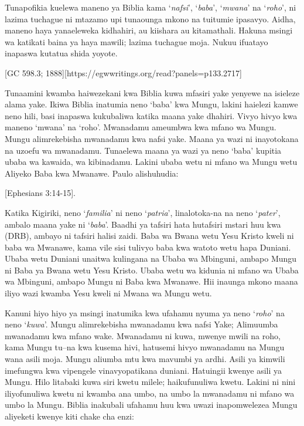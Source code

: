 Tunapofikia kuelewa maneno ya Biblia kama ‘\textit{nafsi}’, ‘\textit{baba}’, ‘\textit{mwana}’ na ‘\textit{roho}’, ni lazima tuchague ni mtazamo upi tunaounga mkono na tuitumie ipasavyo. Aidha, maneno haya yanaeleweka kidhahiri, au kiishara au kitamathali. Hakuna msingi wa katikati baina ya haya mawili; lazima tuchague moja. Nukuu ifuatayo inapaswa kutatua shida yoyote.

[GC 598.3; 1888][https://egwwritings.org/read?panels=p133.2717]

Tunaamini kwamba haiwezekani kwa Biblia kuwa mfasiri yake yenyewe na isieleze alama yake. Ikiwa Biblia inatumia neno ‘baba’ kwa Mungu, lakini haielezi kamwe neno hili, basi inapaswa kukubaliwa katika maana yake dhahiri. Vivyo hivyo kwa maneno ‘mwana’ na ‘roho’. Mwanadamu ameumbwa kwa mfano wa Mungu. Mungu alimrekebisha mwanadamu kwa nafsi yake. Maana ya wazi ni inayotokana na uzoefu wa mwanadamu. Tunaelewa maana ya wazi ya neno ‘baba’ kupitia ubaba wa kawaida, wa kibinadamu. Lakini ubaba wetu ni mfano wa Mungu wetu Aliyeko Baba kwa Mwanawe. Paulo alishuhudia:

[Ephesians 3:14-15].

Katika Kigiriki, neno ‘\textit{familia}’ ni neno ‘\textit{patria}’, linalotoka-na na neno ‘\textit{pater}’, ambalo maana yake ni ‘\textit{baba}’. Baadhi ya tafsiri hata hutafsiri mstari huu kwa  (DRB), ambayo ni tafsiri halisi zaidi. Baba wa Bwana wetu Yesu Kristo kweli ni baba wa Mwanawe, kama vile sisi tulivyo baba kwa watoto wetu hapa Duniani. Ubaba wetu Duniani unaitwa kulingana na Ubaba wa Mbinguni, ambapo Mungu ni Baba ya Bwana wetu Yesu Kristo. Ubaba wetu wa kidunia ni mfano wa Ubaba wa Mbinguni, ambapo Mungu ni Baba kwa Mwanawe. Hii inaunga mkono maana iliyo wazi kwamba Yesu kweli ni Mwana wa Mungu wetu.

Kanuni hiyo hiyo ya msingi inatumika kwa ufahamu nyuma ya neno ‘\textit{roho}’ na neno ‘\textit{kuwa}’. Mungu alimrekebisha mwanadamu kwa nafsi Yake; Alimuumba mwanadamu kwa mfano wake. Mwanadamu ni kuwa, mwenye mwili na roho, kama Mungu tu--na kwa kusema hivi, hatusemi hivyo mwanadamu na Mungu wana asili moja. Mungu aliumba mtu kwa mavumbi ya ardhi. Asili ya kimwili imefungwa kwa vipengele vinavyopatikana duniani. Hatuingii kwenye asili ya Mungu. Hilo litabaki kuwa siri kwetu milele; haikufunuliwa kwetu. Lakini ni nini iliyofunuliwa kwetu ni kwamba ana umbo, na umbo la mwanadamu ni mfano wa umbo la Mungu. Biblia inakubali ufahamu huu kwa uwazi inapomwelezea Mungu aliyeketi kwenye kiti chake cha enzi:

